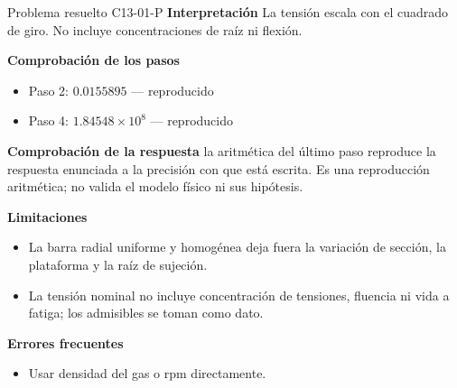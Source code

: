 \documentclass[10pt,openany]{book}
\begin{document}
\begin{studiumworked}{Problema resuelto C13-01-P}
\noindent\textbf{Interpretación}
La tensión escala con el cuadrado de giro. No incluye concentraciones de raíz ni flexión.

\noindent\textbf{Comprobación de los pasos}
\begin{itemize}
\item Paso 2: $0.0155895$ — reproducido
\item Paso 4: $1.84548\times 10^{8}$ — reproducido
\end{itemize}

\noindent\textbf{Comprobación de la respuesta} la aritmética del último paso reproduce la respuesta enunciada a la precisión con que está escrita. Es una reproducción aritmética; no valida el modelo físico ni sus hipótesis.

\noindent\textbf{Limitaciones}
\begin{itemize}
\item La barra radial uniforme y homogénea deja fuera la variación de sección, la plataforma y la raíz de sujeción.
\item La tensión nominal no incluye concentración de tensiones, fluencia ni vida a fatiga; los admisibles se toman como dato.
\end{itemize}

\noindent\textbf{Errores frecuentes}
\begin{itemize}
\item Usar densidad del gas o rpm directamente.
\end{itemize}
\end{studiumworked}
\end{document}
